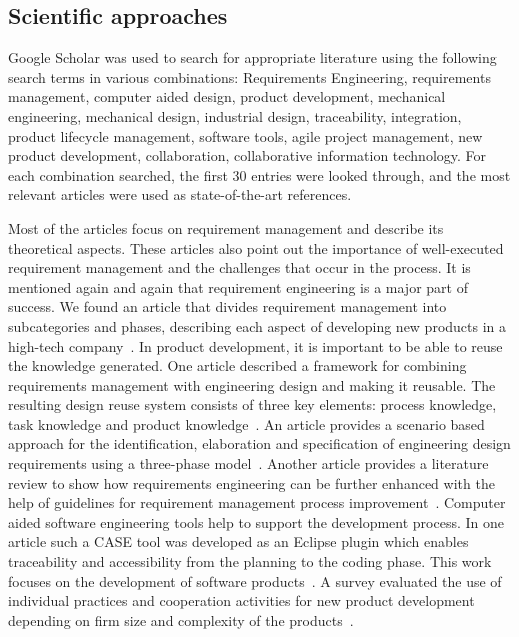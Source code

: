     \subsection*{Scientific approaches}
    Google Scholar was used to search for appropriate literature using the following search terms in various combinations: Requirements Engineering, requirements management, computer aided design, product development, mechanical engineering, mechanical design, industrial design, traceability, integration, product lifecycle management, software tools, agile project management, new product development, collaboration, collaborative information technology. For each combination searched, the first 30 entries were looked through, and the most relevant articles were used as state-of-the-art references. 
    
    Most of the articles focus on requirement management and describe its theoretical aspects. These articles also point out the importance of well-executed requirement management and the challenges that occur in the process. It is mentioned again and again that requirement engineering is a major part of success.
    We found an article that divides requirement management into subcategories and phases, describing each aspect of developing new products in a high-tech company~\cite{Ahti2005}.
    In product development, it is important to be able to reuse the knowledge generated. One article described a framework for combining requirements management with engineering design and making it reusable. The resulting design reuse system consists of three key elements: process knowledge, task knowledge and product knowledge~\cite{BAXTER2008585}.
    An article provides a scenario based approach for the identification, elaboration and specification of engineering design requirements using a three-phase model~\cite{liu2012scenario}.
    Another article provides a literature review to show how requirements engineering can be further enhanced with the help of guidelines for requirement management process improvement~\cite{Kauppinen2005}.
    Computer aided software engineering tools help to support the development process. In one article such a CASE tool was developed as an Eclipse plugin which enables traceability and accessibility from the planning to the coding phase. This work focuses on the development of software products~\cite{6976693}.
    A survey evaluated the use of individual practices and cooperation activities for new product development depending on firm size and complexity of the products~\cite{sanchez2003flexibility}.

